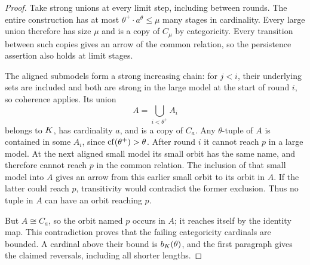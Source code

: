 \begin{proof}
Take strong unions at every limit step, including
between rounds. The entire construction has at most
$\theta^+\cdot a^\theta\leq\mu$ many stages in
cardinality. Every large union therefore has size
$\mu$ and is a copy of $C_\mu$ by categoricity.
Every transition between such copies gives an arrow
of the common relation, so the persistence assertion
also holds at limit stages.

The aligned submodels form a strong increasing chain:
for $j<i$, their underlying sets are included and
both are strong in the large model at the start of
round $i$, so coherence applies. Its union
\[
A=\bigcup_{i<\theta^+}A_i
\]
belongs to $K$, has cardinality $a$, and is a copy
of $C_a$. Any $\theta$-tuple of $A$ is contained
in some $A_i$, since $\operatorname{cf}(\theta^+)>\theta$. After
round $i$ it cannot reach $p$ in a large model.
At the next aligned small model its small orbit
has the same name, and therefore cannot reach $p$
in the common relation. The inclusion of that small
model into $A$ gives an arrow from this earlier
small orbit to its orbit in $A$. If the latter
could reach $p$, transitivity would contradict the
former exclusion. Thus no tuple in $A$ can have
an orbit reaching $p$.

But $A\cong C_a$, so the orbit named $p$ occurs in
$A$; it reaches itself by the identity map. This
contradiction proves that the failing categoricity
cardinals are bounded. A cardinal above their bound
is $b_K(\theta)$, and the first paragraph gives
the claimed reversals, including all shorter lengths.
\end{proof}
